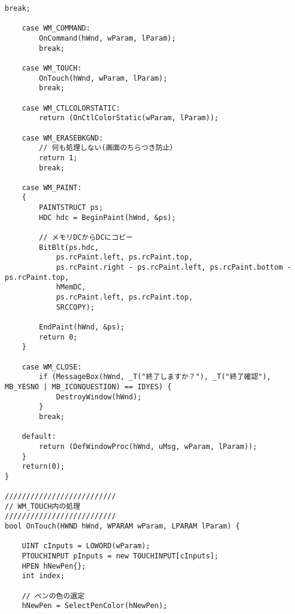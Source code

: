 \begin{lstlisting}[caption=UserInfoWindow.cpp]
		break;
	
	case WM_COMMAND:
		OnCommand(hWnd, wParam, lParam);
		break;

	case WM_TOUCH:
		OnTouch(hWnd, wParam, lParam);
		break;

	case WM_CTLCOLORSTATIC:
		return (OnCtlColorStatic(wParam, lParam));

	case WM_ERASEBKGND:
		// 何も処理しない(画面のちらつき防止）
		return 1;
		break;

	case WM_PAINT:
	{
		PAINTSTRUCT ps;
		HDC hdc = BeginPaint(hWnd, &ps);

		// メモリDCからDCにコピー
		BitBlt(ps.hdc,
			ps.rcPaint.left, ps.rcPaint.top,
			ps.rcPaint.right - ps.rcPaint.left, ps.rcPaint.bottom - ps.rcPaint.top,
			hMemDC,
			ps.rcPaint.left, ps.rcPaint.top,
			SRCCOPY);

		EndPaint(hWnd, &ps);
		return 0;
	}

	case WM_CLOSE:
		if (MessageBox(hWnd, _T("終了しますか？"), _T("終了確認"), MB_YESNO | MB_ICONQUESTION) == IDYES) {
			DestroyWindow(hWnd);
		}
		break;

	default:
		return (DefWindowProc(hWnd, uMsg, wParam, lParam));
	}
	return(0);
}

//////////////////////////
// WM_TOUCH内の処理
//////////////////////////
bool OnTouch(HWND hWnd, WPARAM wParam, LPARAM lParam) {

	UINT cInputs = LOWORD(wParam);
	PTOUCHINPUT pInputs = new TOUCHINPUT[cInputs];
	HPEN hNewPen{};
	int index;

	// ペンの色の選定
	hNewPen = SelectPenColor(hNewPen);


\end{lstlisting}
